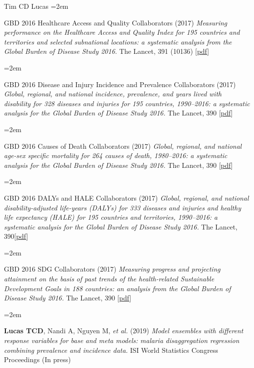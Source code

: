 \documentclass{scrartcl}
\newcommand{\MarginText}[1]{\marginpar{\raggedleft\itshape\small#1}} %
\newcommand{\Description}[1]{\hangindent=2em\hangafter=0\noindent\raggedright\footnotesize{#1}\par\normalsize\vspace{1em}} %
\begin{document}
\begin{cv}{Tim {\Large CD} Lucas}
\Description{GBD 2016 Healthcare Access and Quality Collaborators (2017) \emph{Measuring performance on the Healthcare Access and Quality Index for 195 countries and territories and selected subnational locations: a systematic analysis from the Global Burden of Disease Study 2016.} The Lancet, 391 (10136) [\href{https://www.thelancet.com/action/showPdf?pii=S0140-6736\%2817\%2932336-X}{pdf}]}



\Description{\MarginText{2017}GBD 2016 Disease and Injury Incidence and Prevalence Collaborators (2017) \emph{Global, regional, and national incidence, prevalence, and years lived with disability for 328 diseases and injuries for 195 countries, 1990--2016: a systematic analysis for the Global Burden of Disease Study 2016.} The Lancet, 390 [\href{https://www.thelancet.com/action/showPdf?pii=S0140-6736\%2817\%2932154-2}{pdf}]}

\Description{GBD 2016 Causes of Death Collaborators (2017) \emph{Global, regional, and national age-sex specific mortality for 264 causes of death, 1980--2016: a systematic analysis for the Global Burden of Disease Study 2016.} The Lancet, 390 [\href{https://www.thelancet.com/action/showPdf?pii=S0140-6736\%2817\%2932152-9}{pdf}]}

\Description{GBD 2016 DALYs and HALE Collaborators (2017) \emph{Global, regional, and national disability-adjusted life-years (DALYs) for 333 diseases and injuries and healthy life expectancy (HALE) for 195 countries and territories, 1990--2016: a systematic analysis for the Global Burden of Disease Study 2016.} The Lancet, 390[\href{https://www.thelancet.com/action/showPdf?pii=S0140-6736\%2817\%2932130-X}{pdf}]}

\Description{GBD 2016 SDG Collaborators (2017) \emph{Measuring progress and projecting attainment on the basis of past trends of the health-related Sustainable Development Goals in 188 countries: an analysis from the Global Burden of Disease Study 2016.} The Lancet, 390 [\href{https://www.thelancet.com/action/showPdf?pii=S0140-6736\%2817\%2932336-X}{pdf}]}


{\color{Maroon}}\vspace{1em}

\Description{\MarginText{2019}\textbf{Lucas TCD}, Nandi A, Nguyen M, \emph{et al.} (2019) \emph{Model ensembles with different response variables for base and meta models: malaria disaggregation regression combining prevalence and incidence data.} ISI World Statistics Congress Proceedings (In press)}



\end{cv}
\end{document}
